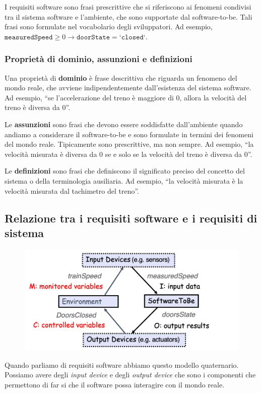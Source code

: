 I requisiti software sono frasi prescrittive che si riferiscono 
ai fenomeni condivisi tra il sistema software e l'ambiente, che sono 
supportate dal software-to-be. Tali frasi sono formulate nel vocabolario 
degli sviluppatori. Ad esempio,
$ \texttt{measuredSpeed} \geq 0 \rightarrow
\texttt{doorState} = \texttt{`closed`} $.

\subsubsection{Proprietà di dominio, assunzioni e definizioni}
Una proprietà di \textbf{dominio} è frase descrittiva che riguarda un fenomeno
del mondo reale, che avviene indipendentemente dall'esistenza 
del sistema software. Ad esempio, ``se l'accelerazione del treno è maggiore
di 0, allora la velocità del treno è diversa da 0''.

Le \textbf{assunzioni} sono frasi che devono essere soddisfatte dall'ambiente 
quando andiamo a considerare il software-to-be e sono formulate 
in termini dei fenomeni del mondo reale. Tipicamente sono prescrittive, 
ma non sempre. Ad esempio, ``la velocità misurata è diversa 
da 0 se e solo se la velocità del treno è diversa da 0''.

Le \textbf{definizioni} sono frasi che definiscono il significato
preciso del concetto del sistema o della terminologia ausiliaria.
Ad esempio, ``la velocità misurata è la velocità misurata 
dal tachimetro del treno''.

\subsection{Relazione tra i requisiti software e i requisiti di sistema}
\begin{figure}[H]
    \centering
    \includegraphics[scale=0.3]{img/modello4.png}
    \label{fig:req_rel}
\end{figure}
Quando parliamo di requisiti software abbiamo questo modello quaternario.
Possiamo avere degli \textit{input device} e degli \textit{output device} che
sono i componenti che permettono di far si che il software possa 
interagire con il mondo reale. 

